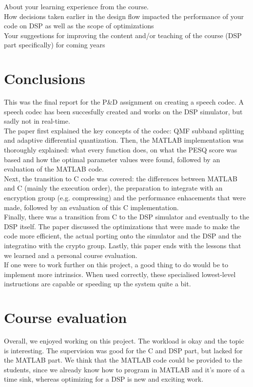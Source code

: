 \documentclass[a4paper]{article}
\begin{document}
About your learning experience from the course.\\
How decisions taken earlier in the design flow impacted the performance of your code on DSP as
well as the scope of optimizations\\
 Your suggestions for improving the content and/or teaching of the course (DSP part specifically) for
coming years

\section{Conclusions}
This was the final report for the P\&D assignment on creating a speech codec. A speech codec has been succesfully created and works on the DSP simulator, but sadly not in real-time. \\
The paper first explained the key concepts of the codec: QMF subband splitting and adaptive differential quantization. Then, the MATLAB implementation was thoroughly explained: what every function does, on what the PESQ score was based and how the optimal parameter values were found, followed by an evaluation of the MATLAB code. \\
Next, the transition to C code was covered: the differences between MATLAB and C (mainly the execution order), the preparation to integrate with an encryption group (e.g. compressing) and the performance enhacements that were made, followed by an evaluation of this C implementation. \\
Finally, there was a transition from C to the DSP simulator and eventually to the DSP itself. The paper discussed the optimizations that were made to make the code more efficient, the actual porting onto the simulator and the DSP and the integratino with the crypto group.
Lastly, this paper ends with the lessons that we learned and a personal course evaluation.\\
If one were to work further on this project, a good thing to do would be to implement more intrinsics. When used correctly, these specialised lowest-level instructions are capable or speeding up the system quite a bit.

\section{Course evaluation}
Overall, we enjoyed working on this project. The workload is okay and the topic is interesting. The supervision was good for the C and DSP part, but lacked for the MATLAB part.
We think that the MATLAB code could be provided to the students, since we already know how to program in MATLAB and it's more of a time sink, whereas optimizing for a DSP is new and exciting work.
\end{document}

